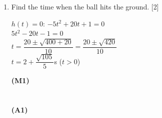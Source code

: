 \documentclass[12pt, twoside]{article}
\begin{document}
\begin{enumerate}[itemsep=0.2cm]
\begin{enumerate}[itemsep=0.3cm]
  \begin{minipage}[t]{0.62\textwidth}
  $h(2) = -5(4) + 20(2) + 1$\\[0.15cm]
  $= -20 + 40 + 1 = 21$\;m
  \end{minipage}%
  \begin{minipage}[t]{0.35\textwidth}\raggedleft
  \textbf{(M1)}\\[0.15cm]
  \textbf{(A1)}
  \end{minipage}

  \medskip
  \item Find the time when the ball hits the ground. \hfill [2]

  \begin{minipage}[t]{0.62\textwidth}
  $h(t) = 0$: \quad $-5t^2 + 20t + 1 = 0$\\[0.15cm]
  $5t^2 - 20t - 1 = 0$\\[0.15cm]
  $t = \dfrac{20 \pm \sqrt{400 + 20}}{10}
     = \dfrac{20 \pm \sqrt{420}}{10}$\\[0.3cm]
  $t = 2 + \dfrac{\sqrt{105}}{5}$\;s
  \quad ($t > 0$)
  \end{minipage}%
  \begin{minipage}[t]{0.35\textwidth}\raggedleft
  \textbf{(M1)}\\[0.15cm]
  ~\\[0.15cm]
  ~\\[0.3cm]
  \textbf{(A1)}
  \end{minipage}
\end{enumerate}

\end{enumerate}
\end{document}
